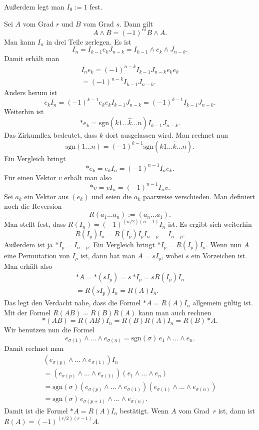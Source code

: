 \documentclass[a4paper,10pt,fleqn,twocolumn,twoside]{article}
\begin{document}
Außerdem legt man $I_0:=1$ fest.

Sei $A$ vom Grad $r$ und $B$ vom Grad $s$. Dann gilt
\[A\wedge B = (-1)^{rs} B\wedge A.\]
Man kann $I_n$ in drei Teile zerlegen. Es ist
\[I_n = I_{k-1}e_k J_{n-k} = I_{k-1}\wedge e_k\wedge J_{n-k}.\]
Damit erhält man
\begin{gather*}
I_n e_k = (-1)^{n-k} I_{k-1}J_{n-k}e_ke_k\\
= (-1)^{n-k} I_{k-1}J_{n-k}.
\end{gather*}
Anders herum ist
\[e_k I_n =  (-1)^{k-1} e_ke_k I_{k-1}J_{n-k}
= (-1)^{k-1} I_{k-1}J_{n-k}.\]
Weiterhin ist
\[*e_k = \mathrm{sgn}(k1\ldots\hat k\ldots n)I_{k-1}J_{n-k}.\]
Das Zirkumflex bedeutet, dass $k$ dort ausgelassen wird.
Man rechnet nun
\[\mathrm{sgn}(1\ldots n) = (-1)^{k-1}
\mathrm{sgn}(k1\ldots\hat k\ldots n).\]
Ein Vergleich bringt
\[*e_k = e_k I_n = (-1)^{n-1} I_n e_k.\]
Für einen Vektor $v$ erhält man also
\[*v = vI_n = (-1)^{n-1}I_n v.\]
Sei $a_k$ ein Vektor aus $(e_k)$ und seien die $a_k$
paarweise verschieden.
Man definiert noch die Reversion
\[R(a_1\ldots a_n) := (a_n\ldots a_1).\]
Man stellt fest, dass $R(I_n)=(-1)^{(n/2)(n-1)}I_n$ ist.
Es ergibt sich weiterhin
\[R(I_p)I_n = R(I_p)I_p I_{n-p} = I_{n-p}.\]
Außerdem ist ja $*I_p = I_{n-p}$. Ein Vergleich bringt $*I_p = R(I_p)I_n$.
Wenn nun $A$ eine Permutation von $I_p$ ist, dann hat man $A=sI_p$,
wobei $s$ ein Vorzeichen ist. Man erhält also
\begin{gather*}
*A = *(sI_p) = s\,{*I_p} = sR(I_p)I_n\\
= R(sI_p)I_n = R(A)I_n.
\end{gather*}
Das legt den Verdacht nahe, dass die Formel
$*A=R(A)I_n$ allgemein gültig ist.
Mit der Formel $R(AB) = R(B)R(A)$ kann man auch rechnen
\[*(AB) = R(AB)I_n = R(B)R(A)I_n = R(B)\,{*A}.\]
Wir benutzen nun die Formel
\[e_{\sigma(1)}\wedge\ldots\wedge e_{\sigma(n)}
= \mathrm{sgn}(\sigma)\, e_1\wedge\ldots\wedge e_n.\]
Damit rechnet man
\begin{gather*}
(e_{\sigma(p)}\wedge\ldots\wedge e_{\sigma(1)})I_n\\
= (e_{\sigma(p)}\wedge\ldots\wedge e_{\sigma(1)})
(e_1\wedge\ldots\wedge e_n)\\
= \mathrm{sgn}(\sigma)(e_{\sigma(p)}\wedge\ldots\wedge e_{\sigma(1)})
(e_{\sigma(1)}\wedge\ldots\wedge e_{\sigma(n)})\\
= \mathrm{sgn}(\sigma)\, e_{\sigma(p+1)}\wedge\ldots\wedge e_{\sigma(n)}.
\end{gather*}
Damit ist die Formel $*A=R(A)I_n$ bestätigt.
Wenn $A$ vom Grad~$r$ ist, dann ist
$R(A) = (-1)^{(r/2)(r-1)}A$.
\end{document}
